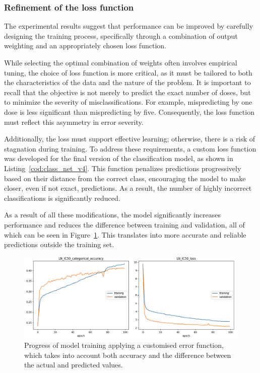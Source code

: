 \subsubsection{Refinement of the loss function}

The experimental results suggest that performance can be improved by carefully designing the training process, specifically through a combination of output weighting and an appropriately chosen loss function.

While selecting the optimal combination of weights often involves empirical tuning, the choice of loss function is more critical, as it must be tailored to both the characteristics of the data and the nature of the problem. It is important to recall that the objective is not merely to predict the exact number of doses, but to minimize the severity of misclassifications. For example, mispredicting by one dose is less significant than mispredicting by five. Consequently, the loss function must reflect this asymmetry in error severity.

Additionally, the loss must support effective learning; otherwise, there is a risk of stagnation during training. To address these requirements, a custom loss function was developed for the final version of the classification model, as shown in Listing~\ref{cod:class_net_v4}. This function penalizes predictions progressively based on their distance from the correct class, encouraging the model to make closer, even if not exact, predictions. As a result, the number of highly incorrect classifications is significantly reduced.

As a result of all these modifications, the model significantly increases performance and reduces the difference between training and validation, all of which can be seen in Figure~\ref{fig:train_class_net_v4}. This translates into more accurate and reliable predictions outside the training set.

\begin{figure}[H]
    \centering
    \includegraphics[width=1\textwidth]{figures/neural_net_classification/classification_custom_loss.png}
    \caption{Progress of model training applying a customised error function, which takes into account both accuracy and the difference between the actual and predicted values.}
    \label{fig:train_class_net_v4}
\end{figure}

